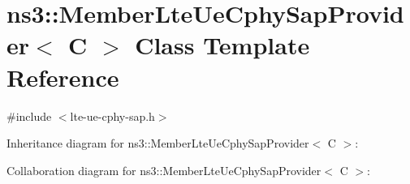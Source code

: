 \hypertarget{classns3_1_1MemberLteUeCphySapProvider}{}\section{ns3\+:\+:Member\+Lte\+Ue\+Cphy\+Sap\+Provider$<$ C $>$ Class Template Reference}
\label{classns3_1_1MemberLteUeCphySapProvider}


{\ttfamily \#include $<$lte-\/ue-\/cphy-\/sap.\+h$>$}



Inheritance diagram for ns3\+:\+:Member\+Lte\+Ue\+Cphy\+Sap\+Provider$<$ C $>$\+:


Collaboration diagram for ns3\+:\+:Member\+Lte\+Ue\+Cphy\+Sap\+Provider$<$ C $>$\+:
